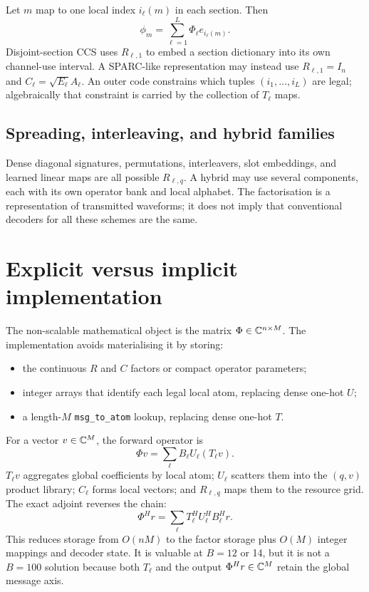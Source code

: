 \documentclass[11pt]{article}
\begin{document}
Let $m$ map to one local index $i_\ell(m)$ in each section. Then
\[
 \phi_m=\sum_{\ell=1}^L\Phi_\ell e_{i_\ell(m)}.
\]
Disjoint-section CCS uses $R_{\ell,1}$ to embed a section dictionary into its own channel-use interval. A SPARC-like
representation may instead use $R_{\ell,1}=I_n$ and $C_\ell=\sqrt{E_\ell}A_\ell$. An outer code constrains which tuples
$(i_1,\ldots,i_L)$ are legal; algebraically that constraint is carried by the collection of $T_\ell$ maps.

\subsection{Spreading, interleaving, and hybrid families}

Dense diagonal signatures, permutations, interleavers, slot embeddings, and learned linear maps are all possible
$R_{\ell,q}$. A hybrid may use several components, each with its own operator bank and local alphabet. The factorisation
is a representation of transmitted waveforms; it does not imply that conventional decoders for all these schemes are
the same.

\section{Explicit versus implicit implementation}

The non-scalable mathematical object is the matrix $\Phi\in\mathbb{C}^{n\times M}$. The implementation avoids materialising
it by storing:
\begin{itemize}
 \item the continuous $R$ and $C$ factors or compact operator parameters;
 \item integer arrays that identify each legal local atom, replacing dense one-hot $U$;
 \item a length-$M$ \texttt{msg\_to\_atom} lookup, replacing dense one-hot $T$.
\end{itemize}

For a vector $v\in\mathbb{C}^M$, the forward operator is
\[
 \Phi v=\sum_\ell B_\ell U_\ell(T_\ell v).
\]
$T_\ell v$ aggregates global coefficients by local atom; $U_\ell$ scatters them into the $(q,v)$ product library;
$C_\ell$ forms local vectors; and $R_{\ell,q}$ maps them to the resource grid. The exact adjoint reverses the chain:
\[
 \Phi^Hr=\sum_\ell T_\ell^HU_\ell^HB_\ell^Hr.
\]
This reduces storage from $O(nM)$ to the factor storage plus $O(M)$ integer mappings and decoder state. It is valuable at
$B=12$ or 14, but it is not a $B=100$ solution because both $T_\ell$ and the output $\Phi^Hr\in\mathbb{C}^M$ retain the global
message axis.
\end{document}
